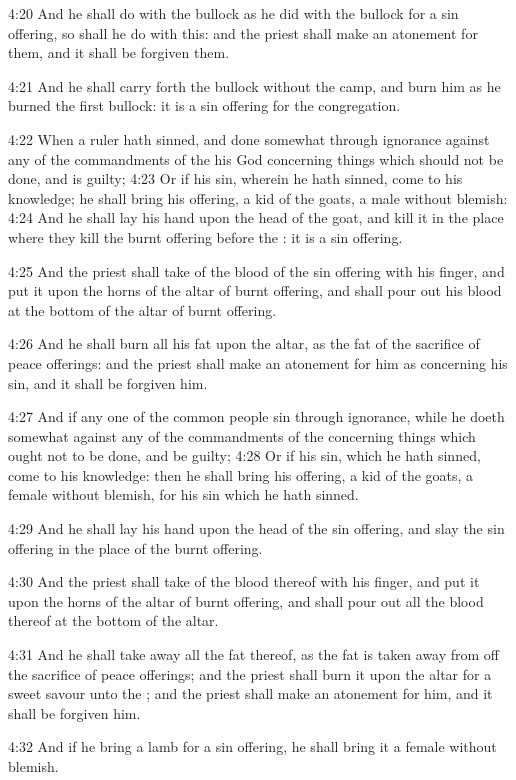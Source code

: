 4:20 And he shall do with the bullock as he did with the bullock for a sin offering, so shall he do with this: and the priest shall make an atonement for them, and it shall be forgiven them.

4:21 And he shall carry forth the bullock without the camp, and burn him as he burned the first bullock: it is a sin offering for the congregation.

4:22 When a ruler hath sinned, and done somewhat through ignorance against any of the commandments of the \LORD his God concerning things which should not be done, and is guilty; 4:23 Or if his sin, wherein he hath sinned, come to his knowledge; he shall bring his offering, a kid of the goats, a male without blemish: 4:24 And he shall lay his hand upon the head of the goat, and kill it in the place where they kill the burnt offering before the \LORD: it is a sin offering.

4:25 And the priest shall take of the blood of the sin offering with his finger, and put it upon the horns of the altar of burnt offering, and shall pour out his blood at the bottom of the altar of burnt offering.

4:26 And he shall burn all his fat upon the altar, as the fat of the sacrifice of peace offerings: and the priest shall make an atonement for him as concerning his sin, and it shall be forgiven him.

4:27 And if any one of the common people sin through ignorance, while he doeth somewhat against any of the commandments of the \LORD concerning things which ought not to be done, and be guilty; 4:28 Or if his sin, which he hath sinned, come to his knowledge: then he shall bring his offering, a kid of the goats, a female without blemish, for his sin which he hath sinned.

4:29 And he shall lay his hand upon the head of the sin offering, and slay the sin offering in the place of the burnt offering.

4:30 And the priest shall take of the blood thereof with his finger, and put it upon the horns of the altar of burnt offering, and shall pour out all the blood thereof at the bottom of the altar.

4:31 And he shall take away all the fat thereof, as the fat is taken away from off the sacrifice of peace offerings; and the priest shall burn it upon the altar for a sweet savour unto the \LORD; and the priest shall make an atonement for him, and it shall be forgiven him.

4:32 And if he bring a lamb for a sin offering, he shall bring it a female without blemish.

